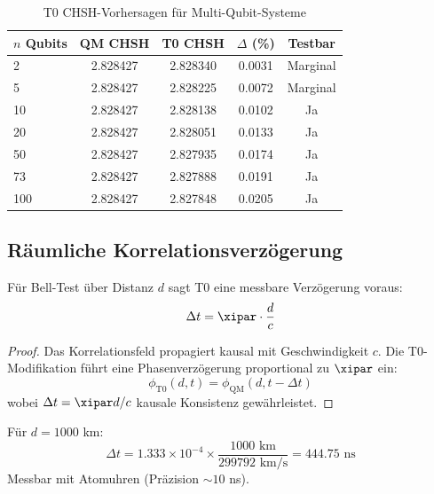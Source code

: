 \begin{table}[h]
	\centering
	\caption{T0 CHSH-Vorhersagen für Multi-Qubit-Systeme}
	\label{tab:chsh_predictions}
	\begin{tabular}{@{}lcccc@{}}
		\toprule
		$n$ Qubits & QM CHSH & T0 CHSH & $\Delta$ (\%) & Testbar \\
		\midrule
		2 & 2.828427 & 2.828340 & 0.0031 & Marginal \\
		5 & 2.828427 & 2.828225 & 0.0072 & Marginal \\
		10 & 2.828427 & 2.828138 & 0.0102 & Ja \\
		20 & 2.828427 & 2.828051 & 0.0133 & Ja \\
		50 & 2.828427 & 2.827935 & 0.0174 & Ja \\
		73 & 2.828427 & 2.827888 & 0.0191 & Ja \\
		100 & 2.828427 & 2.827848 & 0.0205 & Ja \\
		\bottomrule
	\end{tabular}
\end{table}

\subsection{Räumliche Korrelationsverzögerung}

\begin{proposition}
	Für Bell-Test über Distanz $d$ sagt T0 eine messbare Verzögerung voraus:
	\begin{equation}
		\Delta t = \xipar \cdot \frac{d}{c}
		\label{eq:spatial_delay}
	\end{equation}
\end{proposition}

\begin{proof}
	Das Korrelationsfeld propagiert kausal mit Geschwindigkeit $c$. Die T0-Modifikation führt eine Phasenverzögerung proportional zu $\xipar$ ein:
	\begin{equation}
		\phi_{\text{T0}}(d, t) = \phi_{\text{QM}}(d, t - \Delta t)
	\end{equation}
	wobei $\Delta t = \xipar d/c$ kausale Konsistenz gewährleistet.
\end{proof}

\begin{experimentbox}[Satellitentest]
	Für $d = 1000$ km:
	\begin{equation}
		\Delta t = 1.333 \times 10^{-4} \times \frac{1000 \text{ km}}{299792 \text{ km/s}} = 444.75 \text{ ns}
	\end{equation}
	Messbar mit Atomuhren (Präzision $\sim 10$ ns).
\end{experimentbox}

